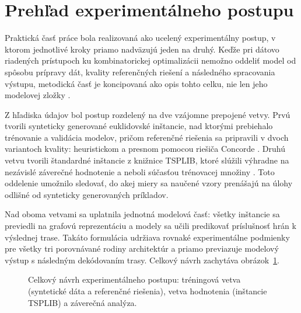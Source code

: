 \section{Prehľad experimentálneho postupu}
\label{sec:prehlad_postupu}

\indent Praktická časť práce bola realizovaná ako ucelený experimentálny
postup, v ktorom jednotlivé kroky priamo nadväzujú jeden na druhý. Keďže
pri dátovo riadených prístupoch ku kombinatorickej optimalizácii nemožno
oddeliť model od spôsobu prípravy dát, kvality referenčných riešení
a následného spracovania výstupu, metodická časť je koncipovaná ako opis
tohto celku, nie len jeho modelovej zložky
\parencite{bengio2021mlco,joshi2022generalization,cappart2023gnnco}.

\indent Z hľadiska údajov bol postup rozdelený na dve vzájomne prepojené
vetvy. Prvú tvorili synteticky generované euklidovské inštancie, nad
ktorými prebiehalo trénovanie a validácia modelov, pričom referenčné
riešenia sa pripravili v dvoch variantoch kvality: heuristickom
a presnom pomocou riešiča Concorde \parencite{concorde2003solver}. Druhú
vetvu tvorili štandardné inštancie z knižnice TSPLIB, ktoré slúžili
výhradne na nezávislé záverečné hodnotenie a neboli súčasťou trénovacej
množiny \parencite{reinelt1991tsplib}. Toto oddelenie umožnilo sledovať,
do akej miery sa naučené vzory prenášajú na úlohy odlišné od synteticky
generovaných príkladov.

\indent Nad oboma vetvami sa uplatnila jednotná modelová časť: všetky
inštancie sa previedli na grafovú reprezentáciu a modely sa učili
predikovať príslušnosť hrán k výslednej trase. Takáto formulácia
udržiava rovnaké experimentálne podmienky pre všetky tri porovnávané
rodiny architektúr a priamo previazuje modelový výstup s následným
dekódovaním trasy. Celkový návrh zachytáva obrázok~\ref{fig:method_overview}.

\begin{figure}[H]
    \centering
    \resizebox{0.96\textwidth}{!}{}
    \caption{Celkový návrh experimentálneho postupu: tréningová vetva
             (syntetické dáta a referenčné riešenia), vetva hodnotenia
             (inštancie TSPLIB) a záverečná analýza.}
    \label{fig:method_overview}
\end{figure}


